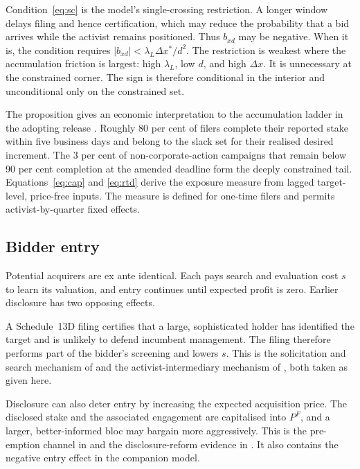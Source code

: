Condition~\eqref{eq:sc} is the model's single-crossing restriction. A longer
window delays filing and hence certification, which may reduce the probability
that a bid arrives while the activist remains positioned. Thus $b_{xd}$ may be
negative. When it is, the condition requires
$|b_{xd}|<\lambda_L\Delta x^\ast/d^2$. The restriction is weakest where the
accumulation friction is largest: high $\lambda_L$, low $d$, and high
$\Delta x$. It is unnecessary at the constrained corner. The sign is therefore
conditional in the interior and unconditional only on the constrained set.

The proposition gives an economic interpretation to the accumulation ladder in
the adopting release \parencite{sec2023modernization}. Roughly 80 per cent of
filers complete their reported stake within five business days and belong to
the slack set for their realised desired increment. The 3 per cent of
non-corporate-action campaigns that remain below 90 per cent completion at the
amended deadline form the deeply constrained tail. Equations~\eqref{eq:cap} and
\eqref{eq:rtd} derive the exposure measure from lagged target-level, price-free
inputs. The measure is defined for one-time filers and permits
activist-by-quarter fixed effects.

\subsection{Bidder entry}
\label{sec:model-entry}

Potential acquirers are ex ante identical. Each pays search and evaluation cost
$s$ to learn its valuation, and entry continues until expected profit is zero.
Earlier disclosure has two opposing effects.

A Schedule~13D filing certifies that a large, sophisticated holder has
identified the target and is unlikely to defend incumbent management. The
filing therefore performs part of the bidder's screening and lowers $s$. This
is the solicitation and search mechanism of \textcite{corumlevit2019} and the
activist-intermediary mechanism of \textcite{burkartlee2022}, both taken as
given here.

Disclosure can also deter entry by increasing the expected acquisition price.
The disclosed stake and the associated engagement are capitalised into $P^F$,
and a larger, better-informed bloc may bargain more aggressively. This is the
pre-emption channel in \textcite{fishman1988} and the disclosure-reform evidence
in \textcite{bonettiduroormazabal2020}. It also contains the negative entry
effect in the companion model.

